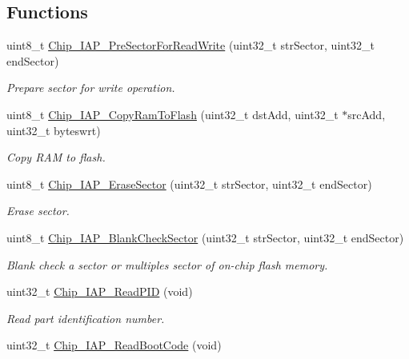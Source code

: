 \subsection*{Functions}
\begin{DoxyCompactItemize}
\item 
uint8\+\_\+t \hyperlink{group___c_o_m_m_o_n___i_a_p_gac45b60745e55670c7fa806e2865625c4}{Chip\+\_\+\+I\+A\+P\+\_\+\+Pre\+Sector\+For\+Read\+Write} (uint32\+\_\+t str\+Sector, uint32\+\_\+t end\+Sector)
\begin{DoxyCompactList}\small\item\em Prepare sector for write operation. \end{DoxyCompactList}\item 
uint8\+\_\+t \hyperlink{group___c_o_m_m_o_n___i_a_p_ga71cb8cde86dc344b05219cdf1ecee638}{Chip\+\_\+\+I\+A\+P\+\_\+\+Copy\+Ram\+To\+Flash} (uint32\+\_\+t dst\+Add, uint32\+\_\+t $\ast$src\+Add, uint32\+\_\+t byteswrt)
\begin{DoxyCompactList}\small\item\em Copy R\+AM to flash. \end{DoxyCompactList}\item 
uint8\+\_\+t \hyperlink{group___c_o_m_m_o_n___i_a_p_ga02dbb90a49e24dc449d45a66f03a4a2d}{Chip\+\_\+\+I\+A\+P\+\_\+\+Erase\+Sector} (uint32\+\_\+t str\+Sector, uint32\+\_\+t end\+Sector)
\begin{DoxyCompactList}\small\item\em Erase sector. \end{DoxyCompactList}\item 
uint8\+\_\+t \hyperlink{group___c_o_m_m_o_n___i_a_p_ga98c7e657a618cf004a8967112dae1a30}{Chip\+\_\+\+I\+A\+P\+\_\+\+Blank\+Check\+Sector} (uint32\+\_\+t str\+Sector, uint32\+\_\+t end\+Sector)
\begin{DoxyCompactList}\small\item\em Blank check a sector or multiples sector of on-\/chip flash memory. \end{DoxyCompactList}\item 
uint32\+\_\+t \hyperlink{group___c_o_m_m_o_n___i_a_p_gaa4b90551649db0627dc195acfc834cbe}{Chip\+\_\+\+I\+A\+P\+\_\+\+Read\+P\+ID} (void)
\begin{DoxyCompactList}\small\item\em Read part identification number. \end{DoxyCompactList}\item 
uint32\+\_\+t \hyperlink{group___c_o_m_m_o_n___i_a_p_ga82606d40a83c8025d59fd6e8b76676ba}{Chip\+\_\+\+I\+A\+P\+\_\+\+Read\+Boot\+Code} (void)

\end{DoxyCompactItemize}
